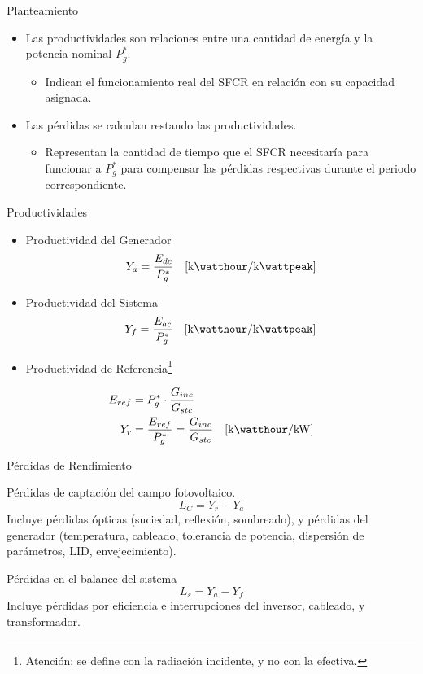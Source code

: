 \documentclass[aspectratio=169, usenames,svgnames,dvipsnames]{beamer}
\begin{document}
\begin{frame}[label={sec:orgcf11392}]{Planteamiento}
\begin{itemize}
\item Las \alert{productividades} son relaciones entre una cantidad de energía y la potencia nominal \(P_g^*\).
\begin{itemize}
\item Indican el funcionamiento real del SFCR en relación con su capacidad asignada.
\end{itemize}
\item Las \alert{pérdidas} se calculan restando las productividades.
\begin{itemize}
\item Representan la cantidad de tiempo que el SFCR necesitaría para funcionar a \(P_g^*\) para compensar las pérdidas respectivas durante el periodo correspondiente.
\end{itemize}
\end{itemize}
\end{frame}
\begin{frame}[label={sec:orgc2d312f}]{Productividades}
\begin{itemize}
\item Productividad del Generador 
\[
  Y_a = \frac{E_{dc}}{P_g^*} \quad [\unit{\kilo\watthour\per\kilo\wattpeak}]
\]

\item Productividad del Sistema
\[
  Y_f = \frac{E_{ac}}{P_g^*} \quad [\unit{\kilo\watthour\per\kilo\wattpeak}]
\]

\item Productividad de Referencia\footnote{Atención: se define con la radiación incidente, y no con la efectiva.}
\end{itemize}
\begin{align*}
  E_{ref} &= P_g^* \cdot \frac{G_{inc}}{G_{stc}}\\
  Y_r &= \frac{E_{ref}}{P_g^*} = \frac{G_{inc}}{G_{stc}} \quad [\unit{\kilo\watthour\per\kilo\watt}]
\end{align*}
\end{frame}
\begin{frame}[label={sec:org0535a56}]{Pérdidas de Rendimiento}
\begin{block}{Pérdidas de captación del campo fotovoltaico.}
\[
  L_C = Y_r - Y_a
\]
Incluye pérdidas ópticas (suciedad, reflexión, sombreado), y pérdidas del generador (temperatura, cableado, tolerancia de potencia, dispersión de parámetros, LID, envejecimiento).
\end{block}

\begin{block}{Pérdidas en el balance del sistema}
\[
  L_s = Y_a - Y_f
\]
Incluye pérdidas por eficiencia e interrupciones del inversor, cableado,  y transformador.
\end{block}
\end{frame}
\end{document}
